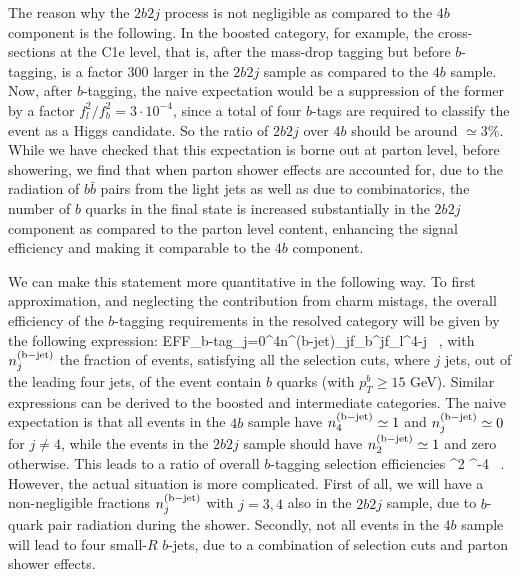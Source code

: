The reason why the  $2b2j$ process
is not negligible as compared to the $4b$ component
is the following.
%
In the boosted category, for example,
the cross-sections at the C1e
level, that is, after the mass-drop tagging but before
$b$-tagging, is a factor 300 larger in the $2b2j$
sample as compared to the $4b$ sample.
%
Now, after $b$-tagging, the naive expectation would
be a suppression of the former by a factor $f_l^2/f_b^2 =3\cdot 10^{-4}$,
since a total of four $b$-tags are required to classify the
event as a Higgs candidate.
%
So the ratio of $2b2j$ over $4b$ should be
around $\simeq 3\%$.
While  we have checked that this expectation is borne
out at parton level, before showering,
we find that  when parton shower effects
are accounted for, due to the radiation of $b\bar{b}$ pairs from the
light jets as well as due to combinatorics, the
number of  $b$ quarks in the  final state is
increased substantially in the $2b2j$ component as compared
to the parton level content,
enhancing the signal efficiency and making
it comparable to the $4b$ component.


We can make this statement more quantitative in the following way.
%
To first approximation, and neglecting the contribution from charm mistags, the
overall efficiency of the $b$-tagging requirements in the resolved category will be
given by the following expression:
\be
\label{btaggingeff}
{\rm EFF}_{\rm b-tag}\simeq \sum_{j=0}^{4}n^{\rm (b-jet)}_j\cdot f_b^{j}\cdot f_l^{4-j} \, ,
\ee
with $n^{\rm (b-jet)}_j$ the fraction of events, satisfying all the selection cuts,
where $j$ jets, out of the leading four jets, of the event contain $b$ quarks (with $p_T^b\ge 15$
GeV).
%
Similar expressions can be derived to the boosted and intermediate categories.
%
The naive expectation is that all events in the $4b$ sample have $n^{\rm (b-jet)}_4\simeq 1$
and $n^{\rm (b-jet)}_j\simeq 0$ for $j\ne 4$, while the events in the $2b2j$ sample
should have $n^{\rm (b-jet)}_2\simeq 1$ and zero otherwise.
%
This leads to a ratio of overall $b$-tagging selection efficiencies
\be
\label{eq:naive}
  \simeq
 \lp {}\rp^2 ^{-4} \, .
\ee
However, the actual situation is more complicated.
%
First of all, we will have a non-negligible fractions $n^{\rm (b-jet)}_j$
with $j=3,4$ also in the $2b2j$ sample, due to $b$-quark pair radiation
during the shower.
%
Secondly, not all events in the $4b$ sample will lead to four small-$R$ $b$-jets,
due to a combination of selection cuts and
parton shower effects.
%

